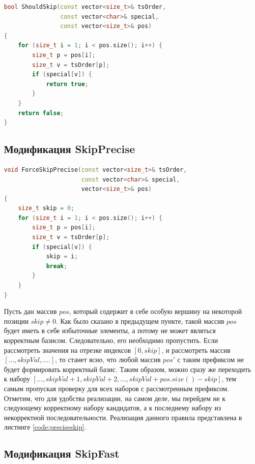 \documentclass[12pt,a4paper,oneside,openany]{article}
\theoremstyle{definition}
\theoremstyle{lemma}
\theoremstyle{remark}
\begin{document}
\begin{lstlisting}[language=C++, caption=Проверка множества на наличие доминируемых вершин, label=code:shouldskip]
bool ShouldSkip(const vector<size_t>& tsOrder,
                const vector<char>& special,
                const vector<size_t>& pos)
{
    for (size_t i = 1; i < pos.size(); i++) {
        size_t p = pos[i];
        size_t v = tsOrder[p];
        if (special[v]) {
            return true;
        }
    }
    return false;
}
\end{lstlisting}

\subsection{Модификация SkipPrecise}\label{subsec:preciseskip}

\begin{lstlisting}[language=C++, caption=Пропуск сразу нескольких наборов кандидатов без ложно-отрицательных результатов, label=code:preciseskip]
void ForceSkipPrecise(const vector<size_t>& tsOrder,
                      const vector<char>& special,
                      vector<size_t>& pos)
{
    size_t skip = 0;
    for (size_t i = 1; i < pos.size(); i++) {
        size_t p = pos[i];
        size_t v = tsOrder[p];
        if (special[v]) {
            skip = i;
            break;
        }
    }
}
\end{lstlisting}



Пусть дан массив $pos$, который содержит в себе особую вершину на некоторой позиции $skip \neq 0$.
Как было сказано в предыдущем пункте, такой массив $pos$ будет иметь в себе избыточные элементы, а
потому не может являться корректным базисом. Следовательно, его необходимо пропустить.
Если рассмотреть значения на отрезке индексов $[0, skip]$, и рассмотреть массив $[..., skipVal, ....]$, то станет ясно, что любой массив $pos'$
с таким префиксом не будет формировать корректный базис. Таким образом, можно сразу же переходить
к набору $[..., skipVal + 1, skipVal + 2, ..., skipVal + pos.size() - skip]$,
тем самым пропуская проверку для всех наборов с рассмотренным префиксом.
Отметим, что для удобства реализации, на самом деле, мы перейдем не к следующему корректному набору
кандидатов, а к последнему набору из некорректной последовательности.
Реализация данного правила представлена в листинге \ref{code:preciseskip}.

\subsection{Модификация SkipFast}\label{subsec:fastskip}
\end{document}
